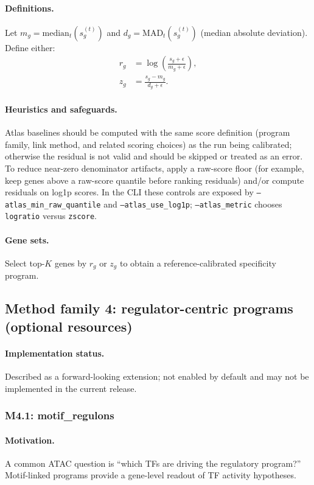 \documentclass[11pt]{article}
\begin{document}
\paragraph{Definitions.} Let $m_g = \mathrm{median}_t(s_g^{(t)})$ and $d_g = \mathrm{MAD}_t(s_g^{(t)})$ (median absolute deviation).
Define either:
\begin{align}
r_g &= \log\left(\frac{s_g+\epsilon}{m_g+\epsilon}\right), \label{eq:atlas_logratio}\\
z_g &= \frac{s_g - m_g}{d_g + \epsilon}. \label{eq:atlas_z}
\end{align}
\paragraph{Heuristics and safeguards.}
Atlas baselines should be computed with the same score definition (program family, link method, and related scoring choices) as the run being calibrated; otherwise the residual is not valid and should be skipped or treated as an error. To reduce near-zero denominator artifacts, apply a raw-score floor (for example, keep genes above a raw-score quantile before ranking residuals) and/or compute residuals on log1p scores. In the CLI these controls are exposed by \texttt{--atlas\_min\_raw\_quantile} and \texttt{--atlas\_use\_log1p}; \texttt{--atlas\_metric} chooses \texttt{logratio} versus \texttt{zscore}.
\paragraph{Gene sets.} Select top-$K$ genes by $r_g$ or $z_g$ to obtain a reference-calibrated specificity program.

\subsection{Method family 4: regulator-centric programs (optional resources)}
\paragraph{Implementation status.} Described as a forward-looking extension; not enabled by default and may not be implemented in the current release.
\subsubsection{M4.1: motif\_regulons}
\paragraph{Motivation.} A common ATAC question is ``which TFs are driving the regulatory program?'' Motif-linked programs provide a gene-level readout of TF activity hypotheses.
\end{document}
